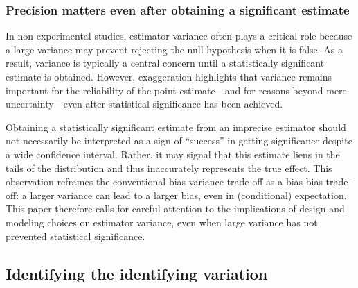 \documentclass[usletter, 12pt]{article}
\begin{document}
		
		
			\subsubsection{Precision matters even after obtaining a significant estimate}
			
				In non-experimental studies, estimator variance often plays a critical role because a large variance may prevent rejecting the null hypothesis when it is false. As a result, variance is typically a central concern until a statistically significant estimate is obtained. However, exaggeration highlights that variance remains important for the reliability of the point estimate---and for reasons beyond mere uncertainty---even after statistical significance has been achieved.
			
				 Obtaining a statistically significant estimate from an imprecise estimator should not necessarily be interpreted as a sign of ``success'' in getting significance despite a wide confidence interval. Rather, it may signal that this estimate liens in the tails of the distribution and thus inaccurately represents the true effect. %
				This observation reframes the conventional bias-variance trade-off as a bias-bias trade-off: a larger variance can lead to a larger bias, even in (conditional) expectation. This paper therefore calls for careful attention to the implications of design and modeling choices on estimator variance, even when large variance has not prevented statistical significance.
			
		\subsection{Identifying the identifying variation}
		
\end{document}
